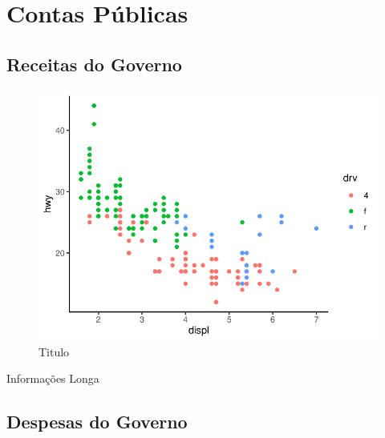 \chapter{Contas Públicas}
\section{Receitas do Governo}
	
\lipsum[1-2]
	
\begin{figure}[h]
	\caption{Titulo}
	\includegraphics[width=\linewidth]{fig/plot}
\end{figure}
	
\lipsum[1]
	
\begin{bbox}{Informações Longa}
	\lipsum[1-2]
\end{bbox}
	
\section{Despesas do Governo}
	
\lipsum[1-2]
	
